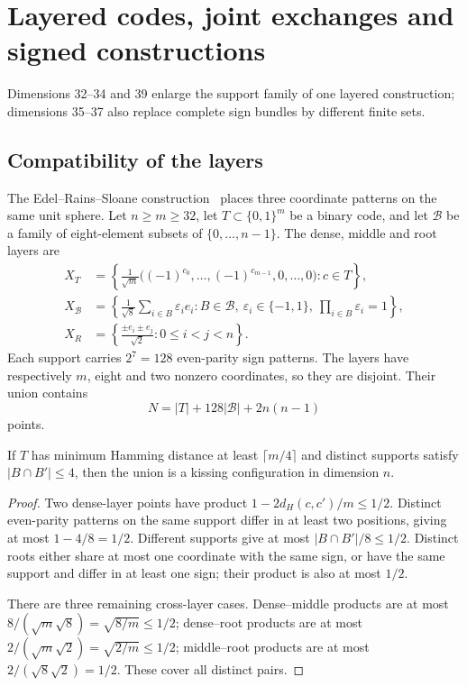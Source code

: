 \section{Layered codes, joint exchanges and signed constructions}
\label{sec:codes}

Dimensions 32--34 and 39 enlarge the support family of one layered
construction; dimensions 35--37 also replace complete sign bundles by
different finite sets.

\subsection{Compatibility of the layers}

The Edel--Rains--Sloane construction~\cite{ers} places three coordinate patterns
on the same unit sphere. Let $n\ge m\ge32$, let $T\subset\{0,1\}^m$ be a
binary code, and let $\mathcal B$ be a family of eight-element subsets of
$\{0,\ldots,n-1\}$. The dense, middle and root layers are
\begin{align*}
X_T&=\left\{\frac{1}{\sqrt m}
 \bigl((-1)^{c_0},\ldots,(-1)^{c_{m-1}},0,\ldots,0\bigr):c\in T\right\},\\
X_{\mathcal B}&=\left\{\frac{1}{\sqrt8}\sum_{i\in B}\varepsilon_i e_i:
 B\in\mathcal B,\ \varepsilon_i\in\{-1,1\},\ \prod_{i\in B}\varepsilon_i=1\right\},\\
X_R&=\left\{\frac{\pm e_i\pm e_j}{\sqrt2}:0\le i<j<n\right\}.
\end{align*}
Each support carries $2^7=128$ even-parity sign patterns. The layers have
respectively $m$, eight and two nonzero coordinates, so they are disjoint.
Their union contains
\begin{equation}
N=|T|+128|\mathcal B|+2n(n-1)
\label{eq:ers-count}
\end{equation}
points.

\begin{proposition}
\label{prop:ers}
If $T$ has minimum Hamming distance at least $\lceil m/4\rceil$ and distinct
supports satisfy $|B\cap B'|\le4$, then the union is a kissing configuration
in dimension $n$.
\end{proposition}
\begin{proof}
Two dense-layer points have product $1-2d_H(c,c')/m\le1/2$.
Distinct even-parity patterns on the same support differ in at least two
positions, giving at most $1-4/8=1/2$. Different supports give at most
$|B\cap B'|/8\le1/2$. Distinct roots either share at most one coordinate
with the same sign, or have the same support and differ in at least one
sign; their product is also at most $1/2$.

There are three remaining cross-layer cases. Dense--middle products are
at most $8/(\sqrt m\sqrt8)=\sqrt{8/m}\le1/2$; dense--root products are
at most $2/(\sqrt m\sqrt2)=\sqrt{2/m}\le1/2$; middle--root products are
at most $2/(\sqrt8\sqrt2)=1/2$. These cover all distinct pairs.
\end{proof}

